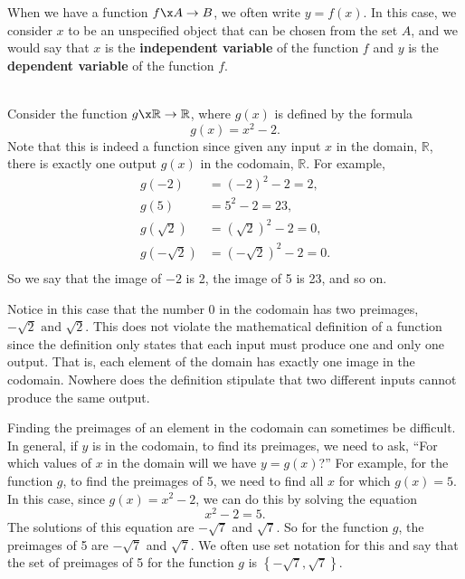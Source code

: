 %
When we have a function $f\x A \to B$, we often write $y = f(x)$.  In this case, we consider $x$ to be an unspecified object that can be chosen from the set $A$, and we would say that  $x$  is the \textbf{independent variable}
%
%
 of the function  $f$  and  $y$  is the \textbf{dependent variable}
%
%
 of the function  $f$.

\begin{example}\label{E:xsquaredminus2} \hfill \\
Consider the function  $g\x \mathbb{R} \to \mathbb{R}$, where  $g( x )$ is defined by the formula
\[
g( x ) = x^2  - 2.
\]
Note that this is indeed a function since given any input  $x$  in the domain, $\mathbb{R}$, there is exactly one output  $g( x )$ in the codomain, $\mathbb{R}$.  For example,
\[
\begin{aligned}
  g( { - 2} )        &= \left( { - 2} \right)^2  - 2 = 2, \\ 
  g( 5 )             &= 5^2  - 2 = 23, \\
  g( {\sqrt 2 } )    &= \left( {\sqrt 2 } \right)^2  - 2 = 0,  \\
  g( { - \sqrt 2 } ) &= \left( { - \sqrt 2 } \right)^2  - 2 = 0. \\ 
\end{aligned}
\]
So we say that the image of  $-2$  is  2, the image of  5  is  23, and so on.  

Notice in this case that the number  0  in the codomain has two preimages, $ - \sqrt 2 \text{ and }\sqrt 2 $.  This does not violate the mathematical definition of a function since the definition only states that each input must produce one and only one output.  That is, each element of the domain has exactly one image in the codomain.  Nowhere does the definition stipulate that two different inputs cannot produce the same output.

Finding the preimages of an element in the codomain can sometimes be difficult.  In general, if  $y$ is in the codomain, to find its preimages, we need to ask, ``For which values of  $x$  in the domain will we have  $y = g( x )$?''  For example, for the function  $g$, to find the preimages of  5, we need to find all  $x$  for which  $g( x ) = 5$.  In this case, since  
$g( x ) = x^2  - 2$, we can do this by solving the equation
\[
x^2  - 2 = 5.
\]
The solutions of this equation are  $ - \sqrt 7 $  and  $\sqrt 7 $.  So for the function  $g$, the preimages of  5  are  $ - \sqrt 7 $  and  $\sqrt 7 $.  We often use set notation for this  and say that the set of preimages of 5 for the function $g$ is 
$\left\{ -\sqrt{7}, \sqrt{7} \right\}$.


\end{example}
